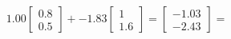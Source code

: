 \documentclass[preview]{standalone}
\begin{document}
\begin{align*}
1.00 \begin{bmatrix} 0.8 \\ 0.5 \end{bmatrix} + -1.83 \begin{bmatrix} 1 \\ 1.6 \end{bmatrix} = \begin{bmatrix} -1.03 \\ -2.43 \end{bmatrix} =
\end{align*}
\end{document}
